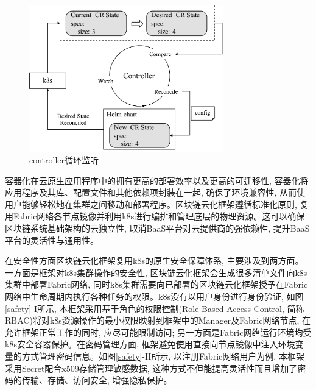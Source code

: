 \begin{figure}[h] %
    \centering %
    \includegraphics[width=0.75\textwidth]{FIGs/chapter3/controller.pdf} %
    \caption{controller循环监听} %
    \label{controller} %
\end{figure}%

容器化在云原生应用程序中的拥有更高的部署效率\cite{zhou2021container}以及更高的可迁移性, 容器化将应用程序及其库、配置文件和其他依赖项封装在一起, 确保了环境兼容性, 从而使用户能够轻松地在集群之间移动和部署程序。区块链云化框架遵循标准化原则, 复用Fabric网络各节点镜像并利用k8s进行编排和管理底层的物理资源。这可以确保区块链系统基础架构的云独立性, 取消BaaS平台对云提供商的强依赖性, 提升BaaS平台的灵活性与通用性。

在安全性方面区块链云化框架复用k8s的原生安全保障体系, 主要涉及到两方面。 一方面是框架对k8s集群操作的安全性, 区块链云化框架会生成很多清单文件向k8s集群中部署Fabric网络, 同时k8s集群需要向已部署的区块链云化框架授予在Fabric网络中生命周期内执行各种任务的权限。k8s没有以用户身份进行身份验证, 如图\ref{safety}-I所示, 本框架采用基于角色的权限控制(Role-Based Access Control, 简称RBAC)将对k8s资源操作的最小权限映射到框架中的Manager及Fabric网络节点, 在允许框架正常工作的同时, 应尽可能限制访问; 另一方面是Fabric网络运行环境均受k8s安全容器保护。在密码管理方面, 框架避免使用直接向节点镜像中注入环境变量的方式管理密码信息。如图\ref{safety}-II所示, 以注册Fabric网络用户为例, 本框架采用Secret配合x509\cite{8249485}存储管理敏感数据, 这种方式不但能提高灵活性而且增加了密码的传输、存储、访问安全, 增强隐私保护。

